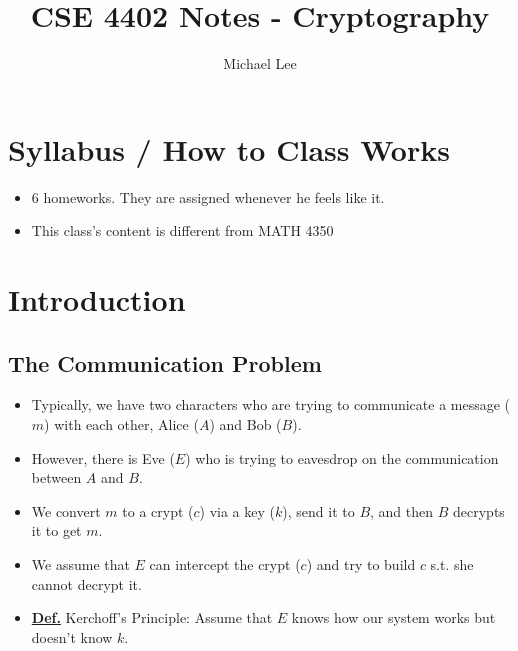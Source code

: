 \documentclass[11pt]{article}
\title{CSE 4402 Notes - Cryptography}
\author{Michael Lee}
\newcommand{\defn}{\underline{\textbf{Def.}} }
\begin{document}
\maketitle

\tableofcontents

\newpage

\section{Syllabus / How to Class Works}
\begin{itemize}
    \item 6 homeworks. They are assigned whenever he feels like it.
    \item This class's content is different from MATH 4350
\end{itemize}

\section{Introduction}
\subsection{The Communication Problem}
\begin{itemize}
    \item Typically, we have two characters who are trying to communicate a message (\(m\)) with each other, Alice (\(A\)) and Bob (\(B\)).
    \item However, there is Eve (\(E\)) who is trying to eavesdrop on the communication between \(A\) and \(B\).
    \item We convert \(m\) to a crypt (\(c\)) via a key (\(k\)), send it to \(B\), and then \(B\) decrypts it to get \(m\).
    \item We assume that \(E\) can intercept the crypt (\(c\)) and try to build \(c\) s.t. she cannot decrypt it. \\
    \item \defn Kerchoff's Principle: Assume that \(E\) knows how our system works but doesn't know \(k\).
\end{itemize}
\end{document}
